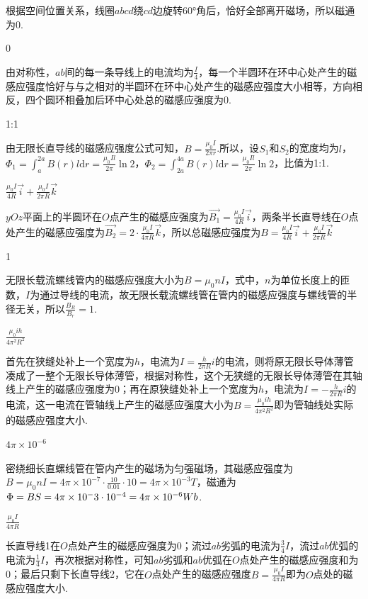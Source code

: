 \documentclass[b5paper,opensource,sourcefont,parskip]{qyxf-book}
\newcommand{\di}[1]{\mathrm{d}#1}
\begin{document}
\analysis
根据空间位置关系，线圈$abcd$绕$cd$边旋转60°角后，恰好全部离开磁场，所以磁通为0.

 0

\analysis
由对称性，$ab$间的每一条导线上的电流均为$\frac{I}{4}$，每一个半圆环在环中心处产生的磁感应强度恰好与与之相对的半圆环在环中心处产生的磁感应强度大小相等，方向相反，四个圆环相叠加后环中心处总的磁感应强度为0.

 1:1

\solve
由无限长直导线的磁感应强度公式可知，$B=\frac{\mu_0I}{2\pi r}$.所以，设$S_1$和$S_2$的宽度均为$l$，$\Phi_1=\int_a^{2a}B(r)l\di r=\frac{\mu_0Il}{2\pi}\ln2$，$\Phi_2=\int_{2a}^{4a}B(r)l\di r=\frac{\mu_0Il}{2\pi}\ln2$，比值为1:1.

 $\frac{\mu_0I}{4R}\vec{i}+\frac{\mu_0I}{2\pi R}\vec{k}$

\solve
$yOz$平面上的半圆环在$O$点产生的磁感应强度为$\vec{B_1}=\frac{\mu_0I}{4R}\vec{i}$，两条半长直导线在$O$点处产生的磁感应强度为$\vec{B_2}=2\cdot\frac{\mu_0I}{4\pi R}\vec{k}$，所以总磁感应强度为$B=\frac{\mu_0I}{4R}\vec{i}+\frac{\mu_0I}{2\pi R}\vec{k}$


 1

\analysis
无限长载流螺线管内的磁感应强度大小为$B=\mu_0nI$，式中，$n$为单位长度上的匝数，$I$为通过导线的电流，故无限长载流螺线管在管内的磁感应强度与螺线管的半径无关，所以$\frac{B_R}{B_r}=1$.

 $\frac{\mu_0ih}{4\pi^2R^2}$

\solve
首先在狭缝处补上一个宽度为$h$，电流为$I=\frac{h}{2\pi R}i$的电流，则将原无限长导体薄管凑成了一整个无限长导体薄管，根据对称性，这个无狭缝的无限长导体薄管在其轴线上产生的磁感应强度为0；再在原狭缝处补上一个宽度为$h$，电流为$I=-\frac{h}{2\pi R}i$的电流，这一电流在管轴线上产生的磁感应强度大小为$B=\frac{\mu_0ih}{4\pi^2R^2}$即为管轴线处实际的磁感应强度大小.

 $4\pi\times10^{-6}$


\solve
密绕细长直螺线管在管内产生的磁场为匀强磁场，其磁感应强度为$B=\mu_0nI=4\pi\times10^{-7}\cdot\frac{10}{0.01}\cdot10=4\pi\times10^{-3}T$，磁通为$\Phi=BS=4\pi\times10^-3\cdot10\time10^{-4}=4\pi\times10^{-6}Wb$.

 $\frac{\mu_0I}{4\pi R}$

\solve
长直导线1在$O$点处产生的磁感应强度为$0$；流过$ab$劣弧的电流为$\frac{3}{4}I$，流过$ab$优弧的电流为$\frac{1}{4}I$，再次根据对称性，可知$ab$劣弧和$ab$优弧在$O$点处产生的磁感应强度和为0；最后只剩下长直导线2，它在$O$点处产生的磁感应强度$B=\frac{\mu_0I}{4\pi R}$即为$O$点处的磁感应强度大小.
\end{document}
